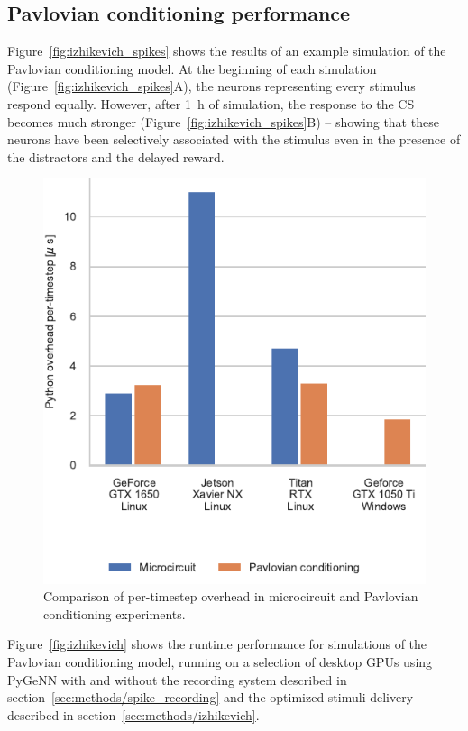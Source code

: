 \documentclass[utf8]{frontiersSCNS} %
\begin{document}
\subsection{Pavlovian conditioning performance}
Figure~\ref{fig:izhikevich_spikes} shows the results of an example simulation of the Pavlovian conditioning model.
At the beginning of each simulation (Figure~\ref{fig:izhikevich_spikes}A), the neurons representing every stimulus respond equally.
However, after \SI{1}{\hour} of simulation, the response to the CS becomes much stronger (Figure~\ref{fig:izhikevich_spikes}B) -- showing that these neurons have been selectively associated with the stimulus even in the presence of the distractors and the delayed reward.
%
\begin{figure}[t!]
    \begin{center}
        \includegraphics{figures/compare_overhead.pdf}
    \end{center}
    \caption{Comparison of per-timestep overhead in microcircuit and Pavlovian conditioning experiments.}
    \label{fig:compare_overhead}
\end{figure}
%
Figure~\ref{fig:izhikevich} shows the runtime performance for simulations of the Pavlovian conditioning model, running on a selection of desktop GPUs using PyGeNN with and without the recording system described in section~\ref{sec:methods/spike_recording} and the optimized stimuli-delivery described in section~\ref{sec:methods/izhikevich}.
\end{document}
